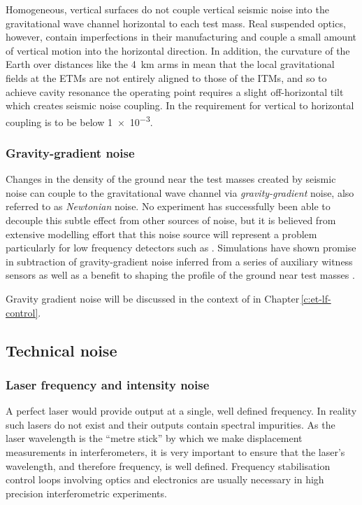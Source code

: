 Homogeneous, vertical surfaces do not couple vertical seismic noise into the gravitational wave channel horizontal to each test mass. Real suspended optics, however, contain imperfections in their manufacturing and couple a small amount of vertical motion into the horizontal direction. In addition, the curvature of the Earth over distances like the \SI{4}{\kilo\meter} arms in \ALIGO{} mean that the local gravitational fields at the \glspl{ETM} are not entirely aligned to those of the \glspl{ITM}, and so to achieve cavity resonance the operating point requires a slight off-horizontal tilt which creates seismic noise coupling. In \ALIGO{} the requirement for vertical to horizontal coupling is to be below \num{1e-3}.

\subsubsection{\label{sec:gravity-gradient-noise}Gravity-gradient noise}
Changes in the density of the ground near the test masses created by seismic noise can couple to the gravitational wave channel via \emph{gravity-gradient} noise, also referred to as \emph{Newtonian} noise. No experiment has successfully been able to decouple this subtle effect from other sources of noise, but it is believed from extensive modelling effort that this noise source will represent a problem particularly for low frequency detectors such as \ETLF{} \cite{ET2011, Hild2011}. Simulations have shown promise in subtraction of gravity-gradient noise inferred from a series of auxiliary witness sensors \cite{Harms2015} as well as a benefit to shaping the profile of the ground near test masses \cite{Harms2014}.

Gravity gradient noise will be discussed in the context of \ETLF{} in Chapter\,\ref{c:et-lf-control}.

\subsection{Technical noise}

\subsubsection{\label{sec:laser-noise}Laser frequency and intensity noise}
A perfect laser would provide output at a single, well defined frequency. In reality such lasers do not exist and their outputs contain spectral impurities. As the laser wavelength is the ``metre stick'' by which we make displacement measurements in interferometers, it is very important to ensure that the laser's wavelength, and therefore frequency, is well defined. Frequency stabilisation control loops involving optics and electronics are usually necessary in high precision interferometric experiments.

